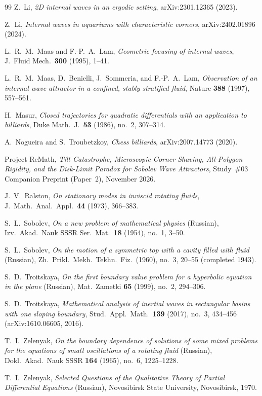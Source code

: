 \documentclass[11pt,reqno]{amsart}
\theoremstyle{definition}
\theoremstyle{remark}
\begin{document}
\begin{thebibliography}{99}
Z.~Li,
\emph{2D internal waves in an ergodic setting},
arXiv:2301.12365 (2023).

Z.~Li,
\emph{Internal waves in aquariums with characteristic corners},
arXiv:2402.01896 (2024).

L.~R.~M.~Maas and F.-P.~A.~Lam,
\emph{Geometric focusing of internal waves},
J.\ Fluid Mech.\ \textbf{300} (1995), 1--41.

L.~R.~M.~Maas, D.~Benielli, J.~Sommeria, and F.-P.~A.~Lam,
\emph{Observation of an internal wave attractor in a confined, stably stratified fluid},
Nature \textbf{388} (1997), 557--561.

H.~Masur,
\emph{Closed trajectories for quadratic differentials with an application to billiards},
Duke Math.\ J.\ \textbf{53} (1986), no.~2, 307--314.

A.~Nogueira and S.~Troubetzkoy,
\emph{Chess billiards},
arXiv:2007.14773 (2020).

Project ReMath,
\emph{Tilt Catastrophe, Microscopic Corner Shaving, All-Polygon Rigidity, and the Disk-Limit Paradox for Sobolev Wave Attractors},
Study~\#03 Companion Preprint (Paper~2), November 2026.

J.~V.~Ralston,
\emph{On stationary modes in inviscid rotating fluids},
J.\ Math.\ Anal.\ Appl.\ \textbf{44} (1973), 366--383.

S.~L.~Sobolev,
\emph{On a new problem of mathematical physics} (Russian),
Izv.\ Akad.\ Nauk SSSR Ser.\ Mat.\ \textbf{18} (1954), no.~1, 3--50.

S.~L.~Sobolev,
\emph{On the motion of a symmetric top with a cavity filled with fluid} (Russian),
Zh.\ Prikl.\ Mekh.\ Tekhn.\ Fiz.\ (1960), no.~3, 20--55 (completed 1943).

S.~D.~Troitskaya,
\emph{On the first boundary value problem for a hyperbolic equation in the plane} (Russian),
Mat.\ Zametki \textbf{65} (1999), no.~2, 294--306.

S.~D.~Troitskaya,
\emph{Mathematical analysis of inertial waves in rectangular basins with one sloping boundary},
Stud.\ Appl.\ Math.\ \textbf{139} (2017), no.~3, 434--456 (arXiv:1610.06605, 2016).

T.~I.~Zelenyak,
\emph{On the boundary dependence of solutions of some mixed problems for the equations of small oscillations of a rotating fluid} (Russian),
Dokl.\ Akad.\ Nauk SSSR \textbf{164} (1965), no.~6, 1225--1228.

T.~I.~Zelenyak,
\emph{Selected Questions of the Qualitative Theory of Partial Differential Equations} (Russian),
Novosibirsk State University, Novosibirsk, 1970.

\end{thebibliography}
\end{document}

